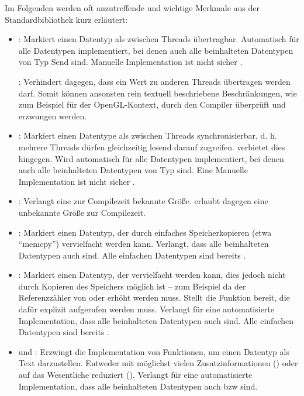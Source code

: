 Im Folgenden werden oft anzutreffende und wichtige Merkmale aus der Standardbibliothek kurz erläutert:
\begin{itemize}
	\item {}: Markiert einen Datentyp als zwischen Threads übertragbar. Automatisch für alle Datentypen implementiert, bei denen auch alle beinhalteten Datentypen von Typ Send sind. Manuelle Implementation ist nicht sicher \cite{rust:book:send_sync}.
	
	: Verhindert dagegen, dass ein Wert zu anderen Threads übertragen werden darf.
	Somit können ansonsten rein textuell beschriebene Beschränkungen, wie zum Beispiel für der OpenGL-Kontext, durch den Compiler überprüft und erzwungen werden.
	
	\item {}: Markiert einen Datentype als zwischen Threads synchronisierbar, d. h. mehrere Threads dürfen gleichzeitig lesend darauf zugreifen.
	 verbietet dies hingegen.
	Wird automatisch für alle Datentypen implementiert, bei denen auch alle beinhalteten Datentypen von Typ  sind.
	Eine Manuelle Implementation ist nicht sicher \cite{rust:book:send_sync}.
	
	\item {}: Verlangt eine zur Compilezeit bekannte Größe.  erlaubt dagegen eine unbekannte Größe zur Compilezeit.
	
	\item {}: Markiert einen Datentyp, der durch einfaches Speicherkopieren (etwa \enquote{memcpy}) vervielfacht werden kann. Verlangt, dass alle beinhalteten Datentypen auch  sind.
	Alle einfachen Datentypen sind bereits .
	
	\item {}: Markiert einen Datentyp, der vervielfacht werden kann, dies jedoch nicht durch Kopieren des Speichers möglich ist -- zum Beispiel da der Referenzzähler von  oder  erhöht werden muss.
	Stellt die Funktion  bereit, die dafür explizit aufgerufen werden muss.
	Verlangt für eine automatisierte Implementation, dass alle beinhalteten Datentypen auch  sind.
	Alle einfachen Datentypen sind bereits .
	
	\item {} und : Erzwingt die Implementation von Funktionen, um einen Datentyp als Text darzustellen. Entweder mit möglichst vielen Zusatzinformationen () oder auf das Wesentliche reduziert ().
	Verlangt für eine automatisierte Implementation, dass alle beinhalteten Datentypen auch  bzw  sind.
	

\end{itemize}
